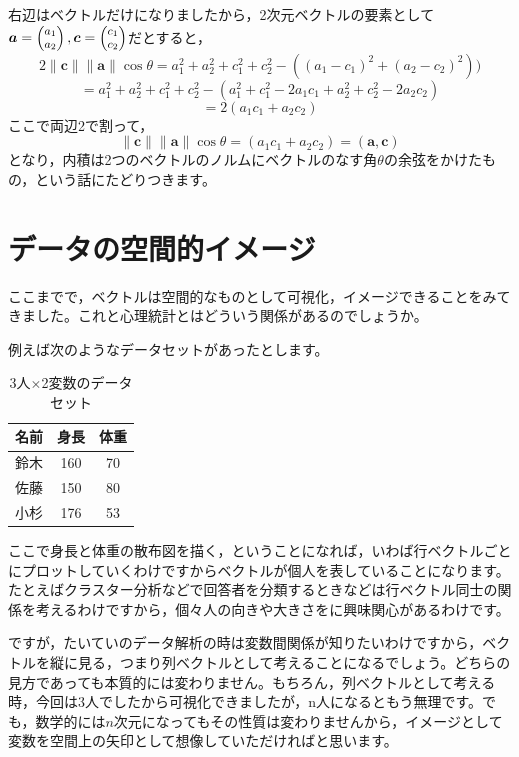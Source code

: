\documentclass{ltjsbook}
\begin{document}
右辺はベクトルだけになりましたから，2次元ベクトルの要素として$\bm{a} = \footnotesize \begin{pmatrix} a_1\\a_2 \end{pmatrix}, \bm{c} = \footnotesize \begin{pmatrix}c_1\\c_2\end{pmatrix}$だとすると，
\[ 2\| \bm{c} \| \| \bm{a}\| \cos \theta = a_1^2 + a_2^2 + c_1^2 + c_2^2 -((a_1-c_1)^2 +(a_2 - c_2)^2)) \]
\[ = a_1^2 + a_2^2 + c_1^2 + c_2^2 - (a_1^2 + c_1^2 - 2a_1c_1 + a_2^2 + c_2^2 - 2a_2c_2) \]
\[ = 2(a_1c_1 + a_2c_2)\]
ここで両辺2で割って，
\[ \| \bm{c} \| \| \bm{a}\| \cos \theta = (a_1c_1 + a_2c_2) = (\bm{a},\bm{c} )\]
となり，内積は2つのベクトルのノルムにベクトルのなす角$\theta$の余弦をかけたもの，という話にたどりつきます。


\section{データの空間的イメージ}
ここまでで，ベクトルは空間的なものとして可視化，イメージできることをみてきました。これと心理統計とはどういう関係があるのでしょうか。

例えば次のようなデータセットがあったとします。
\begin{table}[ht]
	\centering
	\caption{3人$\times$2変数のデータセット}
	\begin{tabular}{ccc}
		名前 & 身長  & 体重 \\\hline
		鈴木 & 160 & 70 \\
		佐藤 & 150 & 80 \\
		小杉 & 176 & 53 \\\hline
	\end{tabular}
\end{table}
ここで身長と体重の散布図を描く，ということになれば，いわば行ベクトルごとにプロットしていくわけですからベクトルが個人を表していることになります。たとえばクラスター分析などで回答者を分類するときなどは行ベクトル同士の関係を考えるわけですから，個々人の向きや大きさをに興味関心があるわけです。

ですが，たいていのデータ解析の時は変数間関係が知りたいわけですから，ベクトルを縦に見る，つまり列ベクトルとして考えることになるでしょう。どちらの見方であっても本質的には変わりません。もちろん，列ベクトルとして考える時，今回は3人でしたから可視化できましたが，n人になるともう無理です。でも，数学的には$n$次元になってもその性質は変わりませんから，イメージとして変数を空間上の矢印として想像していただければと思います。
\end{document}
